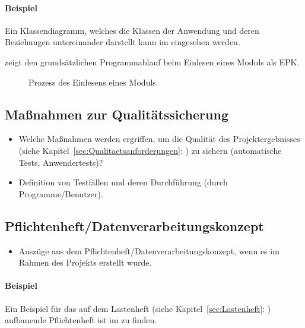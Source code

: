 \paragraph{Beispiel}
Ein Klassendiagramm, welches die Klassen der Anwendung und deren Beziehungen untereinander darstellt kann im  eingesehen werden.

 zeigt den grundsätzlichen Programmablauf beim Einlesen eines Moduls als \ac{EPK}.
\begin{figure}[htb]
\centering
{}
\caption{Prozess des Einlesens eines Moduls}
\label{fig:Modulimport}
\end{figure}


\subsection{Maßnahmen zur Qualitätssicherung}
\label{sec:Qualitaetssicherung}
\begin{itemize}
	\item Welche Maßnahmen werden ergriffen, um die Qualität des Projektergebnisses (siehe Kapitel~\ref{sec:Qualitaetsanforderungen}: ) zu sichern (\zB automatische Tests, Anwendertests)?
	\item \Ggfs Definition von Testfällen und deren Durchführung (durch Programme/Benutzer).
\end{itemize}


\subsection{Pflichtenheft/Datenverarbeitungskonzept}
\label{sec:Pflichtenheft}
\begin{itemize}
	\item Auszüge aus dem Pflichtenheft/Datenverarbeitungskonzept, wenn es im Rahmen des Projekts erstellt wurde.
\end{itemize}

\paragraph{Beispiel}
Ein Beispiel für das auf dem Lastenheft (siehe Kapitel~\ref{sec:Lastenheft}: ) aufbauende Pflichtenheft ist im  zu finden.
